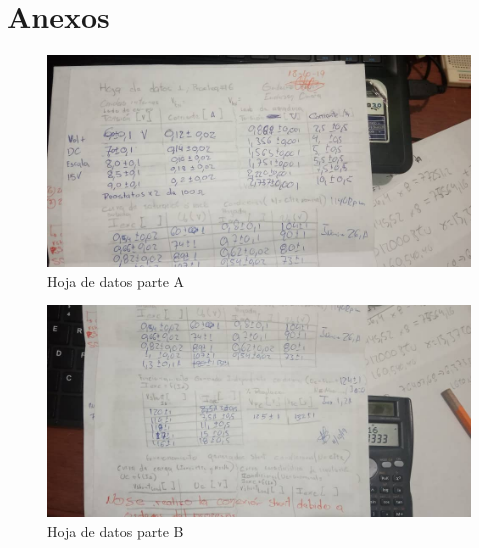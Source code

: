 \documentclass[11pt,letterpaper]{article}     %
\begin{document}
  \section{Anexos}
  	\begin{figure}[H]
  	\centering
  	\includegraphics[scale=0.8]{./recursos-Lab6/HojaDeDatosA.jpeg}
  	\caption{Hoja de datos parte A}
  	\label{fig:Hoja1}
  	\end{figure}  
  \begin{figure}[H]
  	\centering
  	\includegraphics[scale=0.8]{./recursos-Lab6/HojaDeDatosB.jpeg}
  	\caption{Hoja de datos parte B}
  	\label{fig:Hoja2}
  \end{figure}
\end{document}
